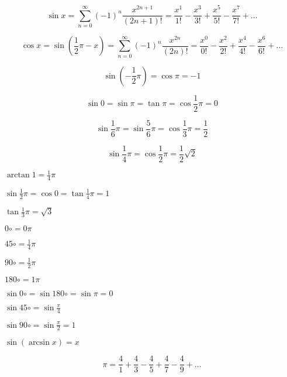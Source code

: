 \documentclass{article}
\begin{document}
\[\sin x = \sum_{n=0}^{\infty}(-1)^n\frac{x^{2n+1}}{(2n+1)!} =
\frac{x^1}{1!} - \frac{x^3}{3!} + \frac{x^5}{5!} - \frac{x^7}{7!} + ...\]

\[ \cos x = \sin(\frac{1}{2}\pi - x) = \sum_{n=0}^{\infty}(-1)^n\frac{x^{2n}}{(2n)!} =
\frac{x^0}{0!} - \frac{x^2}{2!} + \frac{x^4}{4!} - \frac{x^6}{6!} + ...\]

\hrulefill

\[\sin(-\frac{1}{2}\pi) = \cos\pi = -1\]

\[\sin0 = \sin\pi = \tan\pi = \cos\frac{1}{2}\pi = 0\]

\[\sin\frac{1}{6}\pi = \sin\frac{5}{6}\pi = \cos\frac{1}{3}\pi = \frac{1}{2}\]

\[\sin\frac{1}{4}\pi = \cos\frac{1}{2}\pi = \frac{1}{2}\sqrt{2}\]

$\arctan{1} = \frac{1}{4}\pi$

$\sin\frac{1}{2}\pi = \cos0 = \tan\frac{1}{4}\pi = 1$

$\tan\frac{1}{3}\pi = \sqrt{3}$

\hrulefill

$0\circ = 0\pi$

$45\circ = \frac{1}{4}\pi$

$90\circ = \frac{1}{2}\pi$

$180\circ = 1\pi$

\hrulefill

$\sin 0\circ = \sin 180\circ = \sin\pi = 0$

$\sin 45\circ = \sin\frac{\pi}{4}$

$\sin 90\circ = \sin\frac{\pi}{2} = 1$

$\sin(\arcsin x) = x$

\hrulefill

\[\pi = \frac{4}{1} + \frac{4}{3} - \frac{4}{5} + \frac{4}{7} - \frac{4}{9} + ...\]
\end{document}
